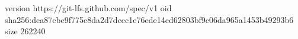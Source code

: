 version https://git-lfs.github.com/spec/v1
oid sha256:dca87cbe9f775e8da2d7dccc1e76ede14cd62803bf9c06da965a1453b49293b6
size 262240
